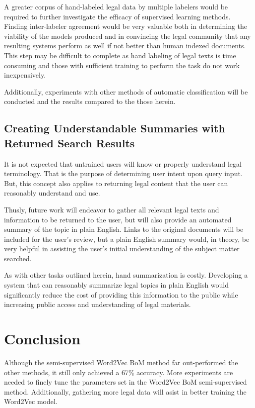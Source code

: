 \documentclass[11pt]{article}
\begin{document}
A greater corpus of hand-labeled legal data by multiple labelers would be required to further investigate the efficacy of supervised learning methods.  Finding inter-labeler agreement would be very valuable both in determining the viability of the models produced and in convincing the legal community that any resulting systems perform as well if not better than human indexed documents.  This step may be difficult to complete as hand labeling of legal texts is time consuming and those with sufficient training to perform the task do not work inexpensively.  

Additionally, experiments with other methods of automatic classification will be conducted and the results compared to the those herein.    

\subsection{Creating Understandable Summaries with Returned Search Results}
It is not expected that untrained users will know or properly understand legal terminology.  That is the purpose of determining user intent upon query input.  But, this concept also applies to returning legal content that the user can reasonably understand and use.  

Thusly, future work will endeavor to gather all relevant legal texts and information to be returned to the user, but will also provide an automated summary of the topic in plain English.  Links to the original documents will be included for the user's review, but a plain English summary would, in theory, be very helpful in assisting the user's initial understanding of the subject matter searched.  

As with other tasks outlined herein, hand summarization is costly.  Developing a system that can reasonably summarize legal topics in plain English would significantly reduce the cost of providing this information to the public while increasing public access and understanding of legal materials.

\section{Conclusion}
Although the semi-supervised Word2Vec BoM method far out-performed the other methods, it still only achieved a 67\% accuracy.  More experiments are needed to finely tune the parameters set in the Word2Vec BoM semi-supervised method.  Additionally, gathering more legal data will asist in better training the Word2Vec model.  
\end{document}

